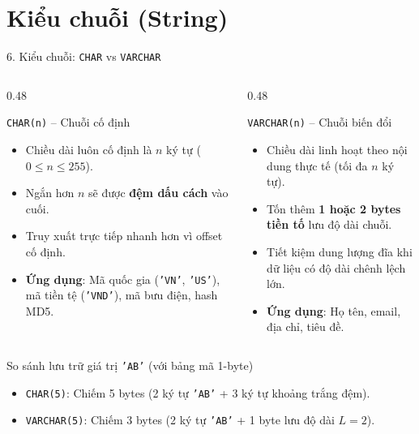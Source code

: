 \documentclass[aspectratio=169,11pt]{beamer}
\newcommand{\kw}[1]{\textcolor{dbblue}{\textbf{#1}}}
\newcommand{\smallgap}{\vspace{0.25em}}
\begin{document}
\section{Kiểu chuỗi (String)}
\begin{frame}{6. Kiểu chuỗi: \texttt{CHAR} vs \texttt{VARCHAR}}
\begin{columns}[t]
  \begin{column}{0.48\textwidth}
    \begin{block}{\texttt{CHAR(n)} -- Chuỗi cố định}
      \begin{itemize}\setlength{\itemsep}{1.5pt}
        \item Chiều dài luôn cố định là $n$ ký tự ($0 \le n \le 255$).
        \item Ngắn hơn $n$ sẽ được \kw{đệm dấu cách} vào cuối.
        \item Truy xuất trực tiếp nhanh hơn vì offset cố định.
        \item \kw{Ứng dụng}: Mã quốc gia (\texttt{'VN'}, \texttt{'US'}), mã tiền tệ (\texttt{'VND'}), mã bưu điện, hash MD5.
      \end{itemize}
    \end{block}
  \end{column}
  \begin{column}{0.48\textwidth}
    \begin{block}{\texttt{VARCHAR(n)} -- Chuỗi biến đổi}
      \begin{itemize}\setlength{\itemsep}{1.5pt}
        \item Chiều dài linh hoạt theo nội dung thực tế (tối đa $n$ ký tự).
        \item Tốn thêm \kw{1 hoặc 2 bytes tiền tố} lưu độ dài chuỗi.
        \item Tiết kiệm dung lượng đĩa khi dữ liệu có độ dài chênh lệch lớn.
        \item \kw{Ứng dụng}: Họ tên, email, địa chỉ, tiêu đề.
      \end{itemize}
    \end{block}
  \end{column}
\end{columns}

\smallgap
\begin{exampleblock}{So sánh lưu trữ giá trị \texttt{'AB'} (với bảng mã 1-byte)}
  \begin{itemize}\setlength{\itemsep}{1pt}
    \item \texttt{CHAR(5)}: Chiếm 5 bytes (2 ký tự \texttt{'AB'} + 3 ký tự khoảng trắng đệm).
    \item \texttt{VARCHAR(5)}: Chiếm 3 bytes (2 ký tự \texttt{'AB'} + 1 byte lưu độ dài $L=2$).
  \end{itemize}
\end{exampleblock}
\end{frame}
\end{document}
